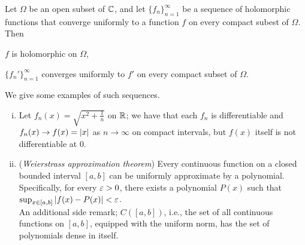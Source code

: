 \begin{theorem}
    Let $\Omega$ be an open subset of $\mathbb C$, and let $\{f_n\}_{n=1}^\infty$ be a sequence of holomorphic functions that converge uniformly to a function $f$ on every compact subest of $\Omega$. Then
    \begin{parlist}
        \item $f$ is holomorphic on $\Omega$,
        \item $\{f_n'\}_{n=1}^\infty$ converges uniformly to $f'$ on every compact subset of $\Omega$.
    \end{parlist}
\end{theorem}
\noindent We give some examples of such sequences.
\begin{enumerate}[(i)]
    \item Let $f_n(x) = \sqrt{x^2 + \frac{1}{n}}$ on $\mathbb R$; we have that each $f_n$ is differentiable and $f_n(x) \to f(x) = \left\lvert x \right\rvert$ as $n \to \infty$ on compact intervals, but $f(x)$ itself is not differentiable at $0$.
    \item (\textit{Weierstrass approximation theorem}) Every continuous function on a closed bounded interval $[a, b]$ can be uniformly approximate by a polynomial. Specifically, for every $\varepsilon > 0$, there exists a polynomial $P(x)$ such that $\sup_{x \in [a, b]} \left\lvert f(x) - P(x) \right\rvert < \varepsilon$.
    \\[8pt]
    An additional side remark; $C([a, b])$, i.e., the set of all continuous functions on $[a, b]$, equipped with the uniform norm, has the set of polynomials dense in itself. 
\end{enumerate}
